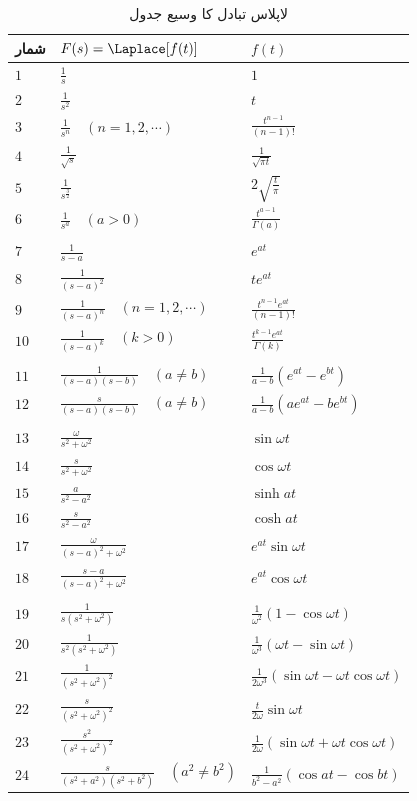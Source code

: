 \begin{table}
\caption{لاپلاس تبادل کا وسیع جدول}
\label{جدول_لاپلاس_وسیع}
\centering
\begin{tabular}{lll}
شمار & $F(s)=\Laplace[f(t)]$ & $f(t)$ \Tstrut \\
\hline 
$1$ & $\frac{1}{s}$ & $1$ \Tstrut\\
$2$ & $\frac{1}{s^2}$ & $t$ \Tstrut\\
$3$ & $\frac{1}{s^n}\quad (n=1,2,\cdots)$  & $\frac{t^{n-1}}{(n-1)!}$ \Tstrut\\
$4$ & $\frac{1}{\sqrt{s}}$ & $\frac{1}{\sqrt{\pi t}}$ \Tstrut\\
$5$ & $\frac{1}{s^{\frac{3}{2}}}$ & $2\sqrt{\frac{t}{\pi}}$ \Tstrut\\
$6$ & $\frac{1}{s^a}\quad (a>0)$ & $\frac{t^{a-1}}{\Gamma(a)}$ \Tstrut\\
\\
$7$ & $\frac{1}{s-a}$ & $e^{at}$ \Tstrut\\
$8$ & $\frac{1}{(s-a)^2}$ & $te^{at}$ \Tstrut\\
$9$ & $\frac{1}{(s-a)^n} \quad (n=1,2,\cdots)$ & $\frac{t^{n-1} e^{at}}{(n-1)!}$  \Tstrut\\
$10$ & $\frac{1}{(s-a)^k} \quad (k>0)$ & $\frac{t^{k-1} e^{at}}{\Gamma(k)}$  \Tstrut\\
\\
$11$ & $\frac{1}{(s-a)(s-b)} \quad (a \ne b)$ & $\frac{1}{a-b} (e^{at}-e^{bt})$  \Tstrut\\
$12$ & $\frac{s}{(s-a)(s-b)} \quad (a\ne b)$ & $\frac{1}{a-b}(ae^{at}-be^{bt})$  \Tstrut\\
\\
$13$ & $\frac{\omega}{s^2+\omega^2}$ & $\sin \omega t$  \Tstrut\\
$14$ & $\frac{s}{s^2+\omega^2}$ & $\cos \omega t$  \Tstrut\\
$15$ & $\frac{a}{s^2-a^2}$ & $\sinh at$  \Tstrut\\
$16$ & $\frac{s}{s^2-a^2}$ & $\cosh at$  \Tstrut\\
$17$ & $\frac{\omega}{(s-a)^2+\omega^2}$ & $e^{at}\sin \omega t$  \Tstrut\\
$18$ & $\frac{s-a}{(s-a)^2+\omega^2}$ & $e^{at}\cos \omega t$  \Tstrut\\
\\
$19$ & $\frac{1}{s(s^2+\omega^2)}$ & $\frac{1}{\omega^2} (1-\cos \omega t)$  \Tstrut\\
$20$ & $\frac{1}{s^2(s^2+\omega^2)}$ & $\frac{1}{\omega^3}(\omega t-\sin \omega t)$  \Tstrut\\
$21$ & $\frac{1}{(s^2+\omega^2)^2}$ & $\frac{1}{2\omega^3}(\sin \omega t-\omega t\cos \omega t)$  \Tstrut\\
$22$ & $\frac{s}{(s^2+\omega^2)^2}$ & $\frac{t}{2\omega} \sin \omega t$  \Tstrut\\
$23$ & $\frac{s^2}{(s^2+\omega^2)^2}$ & $\frac{1}{2\omega}(\sin \omega t+\omega t \cos \omega t)$  \Tstrut\\
$24$ & $\frac{s}{(s^2+a^2)(s^2+b^2)}\quad (a^2 \ne b^2)$ & $\frac{1}{b^2-a^2}(\cos at-\cos bt)$   \Tstrut\\
\end{tabular}
\end{table}
